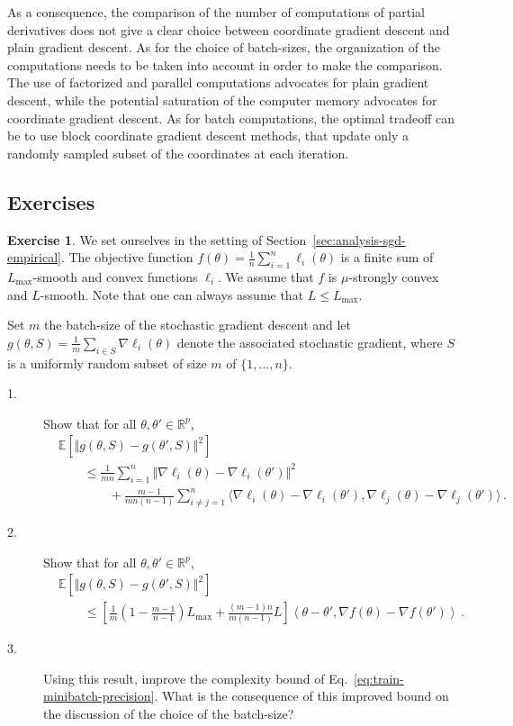 \documentclass[11pt,reqno]{article}
\newcommand{\E}{\mathbb{E}}
\newcommand{\R}{\mathbb{R}}
\renewcommand{\leq}{\leqslant}
\numberwithin{equation}{section}
\theoremstyle{plain}
\theoremstyle{definition}
\newtheorem{exercice}[assumption]{Exercise}
\theoremstyle{remark}
\begin{document}
As a consequence, the comparison of the number of computations of partial derivatives does not give a clear choice between coordinate gradient descent and plain gradient descent. As for the choice of batch-sizes, the organization of the computations needs to be taken into account in order to make the comparison. The use of factorized and parallel computations advocates for plain gradient descent, while the potential saturation of the computer memory advocates for coordinate gradient descent. As for batch computations, the optimal tradeoff can be to use block coordinate gradient descent methods, that update only a randomly sampled subset of the coordinates at each iteration. 

\subsection{Exercises}

\begin{exercice}
	\label{exer:improved-smoothness-batches}
We set ourselves in the setting of Section~\ref{sec:analysis-sgd-empirical}. The objective function $f(\theta) = \frac{1}{n} \sum_{i=1}^n \ell_i(\theta)$ is a finite sum of $L_{\max}$-smooth and convex functions $\ell_i$. We assume that $f$ is $\mu$-strongly convex and $L$-smooth. Note that one can always assume that $L \leq L_{\max}$.

Set $m$ the batch-size of the stochastic gradient descent and let $g(\theta, S) = \frac{1}{m} \sum_{i\in S} \nabla \ell_i(\theta)$ denote the associated stochastic gradient, where $S$ is a uniformly random subset of size $m$ of $\{1,\dots,n\}$.

\begin{description}
	\item[1.] Show that for all $\theta, \theta' \in \R^p$,
	\begin{align*}
		&\E \left[\Vert g(\theta, S) - g(\theta', S) \Vert^2 \right] \\
		&\qquad\leq \frac{1}{mn} \sum_{i=1}^{n} \Vert \nabla \ell_i(\theta) - \nabla \ell_i(\theta') \Vert^2 \\
		&\qquad\qquad+ \frac{m-1}{mn(n-1)} \sum_{i \neq j = 1}^n \langle \nabla \ell_i(\theta) - \nabla \ell_i(\theta'), \nabla \ell_j(\theta) - \nabla \ell_j(\theta') \rangle \, .
	\end{align*}
	\item[2.] Show that for all $\theta, \theta' \in \R^p$,
	\begin{align*}
		&\E \left[\Vert g(\theta, S) - g(\theta', S) \Vert^2 \right] \\
		&\qquad\leq \left[\frac{1}{m}\left(1-\frac{m-1}{n-1}\right) L_{\max} +  \frac{(m-1)n}{m(n-1)} L \right] \left\langle \theta - \theta', \nabla f(\theta) - \nabla f(\theta') \right\rangle \, .
	\end{align*} 
	\item[3.] Using this result, improve the complexity bound of Eq.~\eqref{eq:train-minibatch-precision}. What is the consequence of this improved bound on the discussion of the choice of the batch-size?
\end{description}
\end{exercice}
\end{document}
